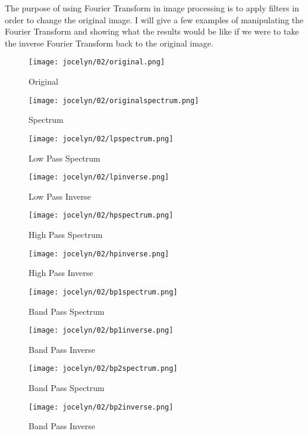 \documentclass [../article.tex]{subfiles}
\begin{document}
  The purpose of using Fourier Transform in image processing is to
  apply filters in order to change the original image.  I will give
  a few examples of manipulating the Fourier Transform and  showing
  what the results would be like if we were to take the inverse
  Fourier Transform back to the original image.
  \begin{figure}[!htb]
      \texttt{[image: jocelyn/02/original.png]}
      \caption{Original}
      \label{fig:original2}
    \endminipage\hfill
      \texttt{[image: jocelyn/02/originalspectrum.png]}
      \caption{Spectrum}
      \label{fig:spectrum2}
    \endminipage
  \end{figure}
  \begin{figure}[!htb]
      \texttt{[image: jocelyn/02/lpspectrum.png]}
      \caption{Low Pass Spectrum}
      \label{fig:lpspectrum}
    \endminipage\hfill
      \texttt{[image: jocelyn/02/lpinverse.png]}
      \caption{Low Pass Inverse}
      \label{fig:lpinverse}
    \endminipage
  \end{figure}
  \begin{figure}[!htb]
      \texttt{[image: jocelyn/02/hpspectrum.png]}
      \caption{High Pass Spectrum}
      \label{fig:hpspectrum}
    \endminipage\hfill
      \texttt{[image: jocelyn/02/hpinverse.png]}
      \caption{High Pass Inverse}
      \label{fig:hpinverse}
    \endminipage
  \end{figure}
  \begin{figure}[!htb]
      \texttt{[image: jocelyn/02/bp1spectrum.png]}
      \caption{Band Pass Spectrum}
      \label{fig:bp1spectrum}
    \endminipage\hfill
      \texttt{[image: jocelyn/02/bp1inverse.png]}
      \caption{Band Pass Inverse}
      \label{fig:bp1inverse}
    \endminipage
  \end{figure}
  \begin{figure}[!htb]
      \texttt{[image: jocelyn/02/bp2spectrum.png]}
      \caption{Band Pass Spectrum}
      \label{fig:bp2spectrum}
    \endminipage\hfill
      \texttt{[image: jocelyn/02/bp2inverse.png]}
      \caption{Band Pass Inverse}
      \label{fig:bp2inverse}
    \endminipage
  \end{figure}
\end{document}
